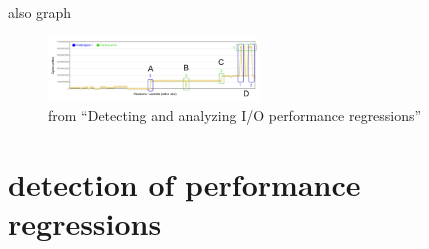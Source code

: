 also graph

\begin{figure}[h]
\begin{center}
  \includegraphics[width=0.5\textwidth]{Figures/bytegraph.PNG}
\end{center}
  \caption{from ``Detecting and analyzing I/O performance regressions''\cite{bezemer2014detecting}}

\end{figure}

\section{detection of performance regressions}





